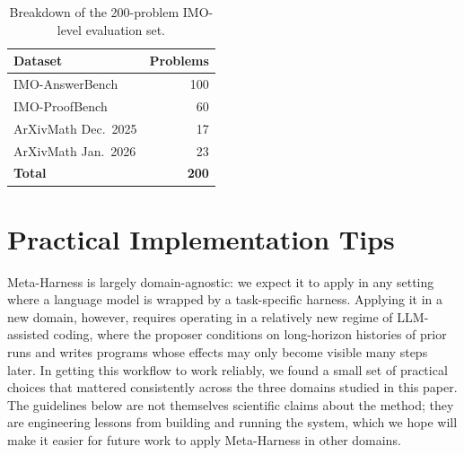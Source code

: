 \begin{table}[h]
\centering
\begin{tabular}{lr}
\toprule
\textbf{Dataset} & \textbf{Problems} \\
\midrule
IMO-AnswerBench & 100 \\
IMO-ProofBench & 60 \\
ArXivMath Dec.\ 2025 & 17 \\
ArXivMath Jan.\ 2026 & 23 \\
\midrule
\textbf{Total} & \textbf{200} \\
\bottomrule
\end{tabular}
\caption{
    Breakdown of the 200-problem IMO-level evaluation set.}
\label{tab:math_eval_breakdown}
\end{table}


\section{Practical Implementation Tips}
\label{app:practical-tips}

Meta-Harness is largely domain-agnostic: we expect it to apply in any setting where a language model is wrapped by a task-specific harness.
Applying it in a new domain, however, requires operating in a relatively new regime of LLM-assisted coding, where the proposer conditions on long-horizon histories of prior runs and writes programs whose effects may only become visible many steps later.
In getting this workflow to work reliably, we found a small set of practical choices that mattered consistently across the three domains studied in this paper.
The guidelines below are not themselves scientific claims about the method; they are engineering lessons from building and running the system, which we hope will make it easier for future work to apply Meta-Harness in other domains.

